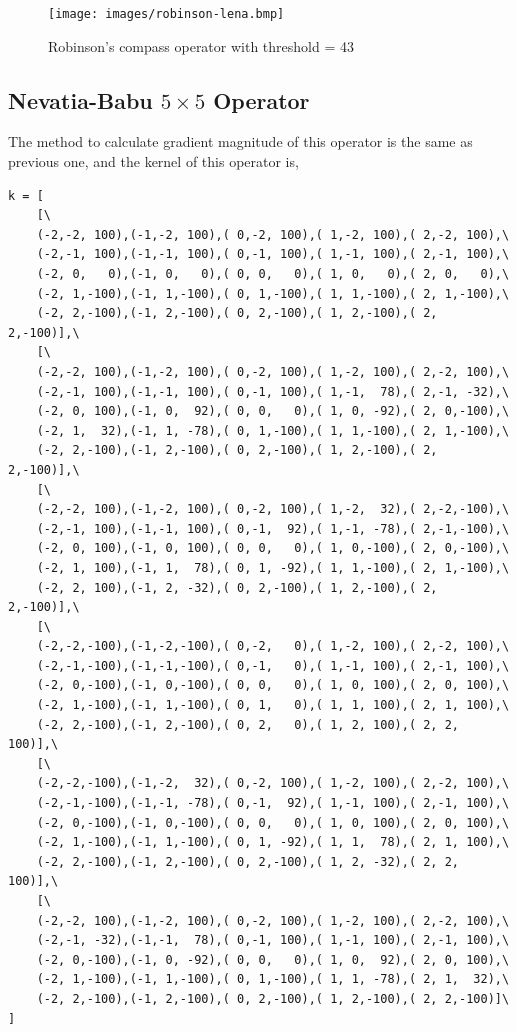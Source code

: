 \documentclass[14pt,a4paper]{extarticle}
\begin{document}
\begin{figure}[H]
\centering
\texttt{[image: images/robinson-lena.bmp]}
\caption{Robinson's compass operator with threshold = 43}
\end{figure}

\subsection{Nevatia-Babu $5\times5$ Operator}

The method to calculate gradient magnitude of this operator is the same as previous one, and the kernel of this operator is,
\begin{lstlisting}
k = [
	[\
	(-2,-2, 100),(-1,-2, 100),( 0,-2, 100),( 1,-2, 100),( 2,-2, 100),\
	(-2,-1, 100),(-1,-1, 100),( 0,-1, 100),( 1,-1, 100),( 2,-1, 100),\
	(-2, 0,   0),(-1, 0,   0),( 0, 0,   0),( 1, 0,   0),( 2, 0,   0),\
	(-2, 1,-100),(-1, 1,-100),( 0, 1,-100),( 1, 1,-100),( 2, 1,-100),\
	(-2, 2,-100),(-1, 2,-100),( 0, 2,-100),( 1, 2,-100),( 2, 2,-100)],\
	[\
	(-2,-2, 100),(-1,-2, 100),( 0,-2, 100),( 1,-2, 100),( 2,-2, 100),\
	(-2,-1, 100),(-1,-1, 100),( 0,-1, 100),( 1,-1,  78),( 2,-1, -32),\
	(-2, 0, 100),(-1, 0,  92),( 0, 0,   0),( 1, 0, -92),( 2, 0,-100),\
	(-2, 1,  32),(-1, 1, -78),( 0, 1,-100),( 1, 1,-100),( 2, 1,-100),\
	(-2, 2,-100),(-1, 2,-100),( 0, 2,-100),( 1, 2,-100),( 2, 2,-100)],\
	[\
	(-2,-2, 100),(-1,-2, 100),( 0,-2, 100),( 1,-2,  32),( 2,-2,-100),\
	(-2,-1, 100),(-1,-1, 100),( 0,-1,  92),( 1,-1, -78),( 2,-1,-100),\
	(-2, 0, 100),(-1, 0, 100),( 0, 0,   0),( 1, 0,-100),( 2, 0,-100),\
	(-2, 1, 100),(-1, 1,  78),( 0, 1, -92),( 1, 1,-100),( 2, 1,-100),\
	(-2, 2, 100),(-1, 2, -32),( 0, 2,-100),( 1, 2,-100),( 2, 2,-100)],\
	[\
	(-2,-2,-100),(-1,-2,-100),( 0,-2,   0),( 1,-2, 100),( 2,-2, 100),\
	(-2,-1,-100),(-1,-1,-100),( 0,-1,   0),( 1,-1, 100),( 2,-1, 100),\
	(-2, 0,-100),(-1, 0,-100),( 0, 0,   0),( 1, 0, 100),( 2, 0, 100),\
	(-2, 1,-100),(-1, 1,-100),( 0, 1,   0),( 1, 1, 100),( 2, 1, 100),\
	(-2, 2,-100),(-1, 2,-100),( 0, 2,   0),( 1, 2, 100),( 2, 2, 100)],\
	[\
	(-2,-2,-100),(-1,-2,  32),( 0,-2, 100),( 1,-2, 100),( 2,-2, 100),\
	(-2,-1,-100),(-1,-1, -78),( 0,-1,  92),( 1,-1, 100),( 2,-1, 100),\
	(-2, 0,-100),(-1, 0,-100),( 0, 0,   0),( 1, 0, 100),( 2, 0, 100),\
	(-2, 1,-100),(-1, 1,-100),( 0, 1, -92),( 1, 1,  78),( 2, 1, 100),\
	(-2, 2,-100),(-1, 2,-100),( 0, 2,-100),( 1, 2, -32),( 2, 2, 100)],\
	[\
	(-2,-2, 100),(-1,-2, 100),( 0,-2, 100),( 1,-2, 100),( 2,-2, 100),\
	(-2,-1, -32),(-1,-1,  78),( 0,-1, 100),( 1,-1, 100),( 2,-1, 100),\
	(-2, 0,-100),(-1, 0, -92),( 0, 0,   0),( 1, 0,  92),( 2, 0, 100),\
	(-2, 1,-100),(-1, 1,-100),( 0, 1,-100),( 1, 1, -78),( 2, 1,  32),\
	(-2, 2,-100),(-1, 2,-100),( 0, 2,-100),( 1, 2,-100),( 2, 2,-100)]\
]
\end{lstlisting}
\end{document}
